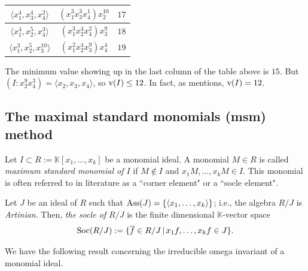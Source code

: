 \documentclass[11pt]{amsart}   %
\begin{document}
\begin{exm}
\begin{center}
\begin{tabular}{c|c|c}
\hline

$\langle x_1^4,x_3^4,x_4^2\rangle$ & $(x_1^3x_3^3x_4^1)x_2^{10}$ & $17$\\

\hline

$\langle x_1^4,x_2^5,x_4^3\rangle$ & $(x_1^3x_2^4x_4^2)x_3^{9}$ & $18$\\

\hline

$\langle x_1^3,x_2^5,x_3^{10}\rangle$ & $(x_1^2x_2^4x_3^9)x_4^{4}$ & $19$
\end{tabular}
\end{center}

The minimum value showing up in the last column of the table above is $15$. But $(I:x_2^9x_4^3)=\langle x_2,x_3,x_4\rangle$, so ${\rm v}(I)\leq 12$. In fact, as \cite[Example 4.3]{CSTVV} mentions, ${\rm v}(I)=12$.


\end{exm}



\medskip

\subsection{The maximal standard monomials (msm) method}\label{sec_msm}

Let $I\subset R:=\mathbb K[x_1,\ldots,x_k]$ be a monomial ideal. A monomial $M\in R$ is called {\em maximum standard monomial of $I$} if $M\notin I$ and $x_1M,\ldots,x_kM\in I$. This monomial is often referred to in literature as a ``corner element" or a ``socle element".

Let $J$ be an ideal of $R$ such that ${\rm Ass}(J)=\{\langle x_1,\ldots,x_k\rangle\}$; i.e., the algebra $R/J$ is {\em Artinian}. Then, {\em the socle of $R/J$} is the finite dimensional $\mathbb K$-vector space $${\rm Soc}(R/J):=\{\overline{f}\in R/J\,|\, x_1f,\ldots,x_kf\in J\}.$$

We have the following result concerning the irreducible omega invariant of a monomial ideal.
\end{document}
